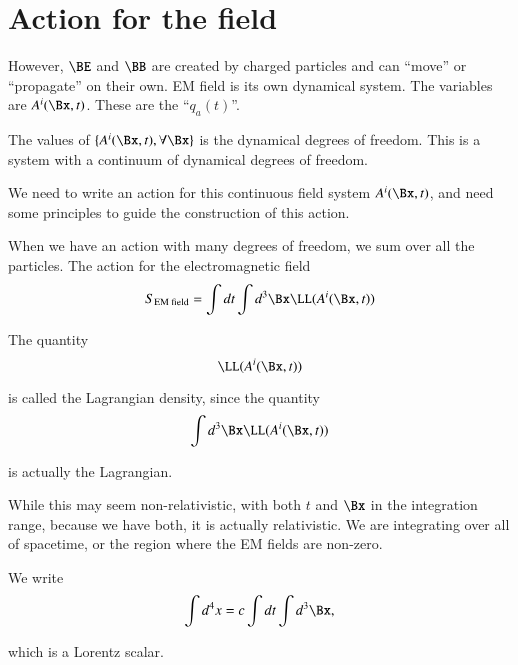 %
%
\section{Action for the field}

However, \(\BE\) and \(\BB\) are created by charged particles and can ``move'' or ``propagate'' on their own.  EM field is its own dynamical system.  The variables are \(A^i(\Bx, t)\).  These are the ``\(q_a(t)\)''.

The values of \(\{A^i(\Bx, t), \forall \Bx\}\) is the dynamical degrees of freedom.  This is a system with a continuum of dynamical degrees of freedom.

We need to write an action for this continuous field system \(A^i(\Bx,t)\), and need some principles to guide the construction of this action.

When we have an action with many degrees of freedom, we sum over all the particles.  The action for the electromagnetic field
%
\begin{equation}\label{eqn:relativisticElectrodynamicsL12b:90}
S_{\text{EM field}} = \int dt \int d^3\Bx \LL(A^i(\Bx, t))
\end{equation}

The quantity
%
\begin{equation}\label{eqn:relativisticElectrodynamicsL12b:110}
\LL(A^i(\Bx, t))
\end{equation}

is called the Lagrangian density, since the quantity
%
\begin{equation}\label{eqn:relativisticElectrodynamicsL12b:130}
\int d^3\Bx \LL(A^i(\Bx, t))
\end{equation}

is actually the Lagrangian.

While this may seem non-relativistic, with both \(t\) and \(\Bx\) in the integration range, because we have both, it is actually relativistic.  We are integrating over all of spacetime, or the region where the EM fields are non-zero.

We write
%
\begin{equation}\label{eqn:relativisticElectrodynamicsL12b:150}
\int d^4 x  = c \int dt \int d^3 \Bx,
\end{equation}

which is a Lorentz scalar.

